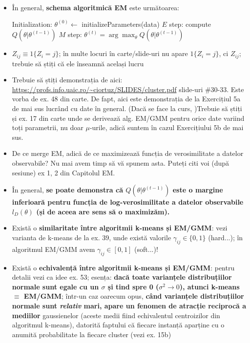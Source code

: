 \documentclass[12pt]{article}
\begin{document}
	\begin{itemize}
		\item În general, \textbf{schema algoritmică EM} este următoarea:
		\begin{algorithmic}
			\STATE Initialization: $\theta^{(0)}\gets$ initializeParameters(data)
			\STATE $E$ step: compute $Q(\theta|\theta^{(t-1)})$
			\STATE $M$ step: $\theta^{(t)} = \arg \max_\theta Q(\theta|\theta^{(t-1)})$
			\ENDFOR
		\end{algorithmic}
		
		\item $Z_{ij} \equiv 1\{Z_i = j\}$; în multe locuri în carte/slide-uri nu apare $1\{Z_i = j\}$, ci $Z_{ij}$; trebuie să știți că ele înseamnă același lucru
		
		\item Trebuie să știți demonstrația de aici: \url{https://profs.info.uaic.ro/~ciortuz/SLIDES/cluster.pdf} slide-uri \#30-33. Este vorba de ex. 48 din carte. De fapt, aici este demonstrația de la Exercițiul 5a de mai sus lucrând cu date în general. (Dacă se face la curs, )Trebuie să știți și ex. 17 din carte unde se derivează alg. EM/GMM pentru orice date variind toți parametrii, nu doar $\mu$-urile, adică suntem în cazul Exercițiului 5b de mai sus.
		
		\item De ce merge EM, adică de ce maximizează funcția de verosimilitate a datelor observabile? Nu mai avem timp să vă spunem asta. Puteți citi voi (după sesiune) ex 1, 2 din Capitolul EM.
		
		\item În general, \textbf{se poate demonstra că $Q(\theta|\theta^{(t-1)})$ este o margine inferioară pentru funcția de log-verosimilitate a datelor observabile $l_D(\theta)$ (și de aceea are sens să o maximizăm).}
		
		\item Există o \textbf{similaritate între algoritmii k-means și EM/GMM}: vezi varianta de k-means de la ex. 39, unde există valorile $\gamma_{ij} \in \{0,1\}$ (hard...); în algoritmul EM/GMM avem $\gamma_{ij} \in [0,1]$ (soft...)!
		
		\item Există o \textbf{echivalență între algoritmii k-means și EM/GMM}: pentru detalii vezi ca idee ex. 53; esența: \textbf{dacă toate varianțele distribuțiilor normale sunt egale cu un $\sigma$ și tind spre 0 ($\sigma^2 \rightarrow 0$), atunci k-means $\equiv$ EM/GMM}; într-un caz oarecum opus, \textbf{când varianțele distribuțiilor normale sunt \textit{relativ} mari, apare un fenomen de \textbf{atracție reciprocă a mediilor}} gaussienelor (aceste medii fiind echivalentul centroizilor din algoritmul k-means), datorită faptului că fiecare instanță aparține cu o anumită probabilitate la fiecare cluster (vezi ex. 15b)
		

\end{itemize}
\end{document}
